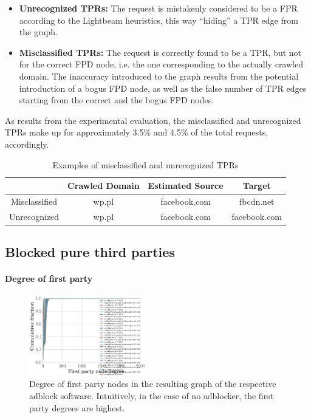 \documentclass{sig-alternate}
\begin{document}
\begin{itemize}
\item \textbf{Unrecognized TPRs:} The request is mistakenly considered to be a FPR according to the Lightbeam heuristics, this way ``hiding'' a TPR edge from the graph.
\item \textbf{Misclassified TPRs:} The request is correctly found to be a TPR, but not for the correct FPD node, i.e. the one corresponding to the actually crawled domain. The inaccuracy introduced to the graph results from the potential introduction of a bogus FPD node, as well as the false number of TPR edges starting from the correct and the bogus FPD nodes.
\end{itemize}

As results from the experimental evaluation, the misclassified and unrecognized TPRs make up for approximately 3.5\% and 4.5\% of the total requests, accordingly.

\begin{table}
\centering
\small
\begin{tabular}{|c|c c c|}
\hline
& Crawled Domain & Estimated Source & Target \\
\hline
Misclassified & wp.pl & facebook.com & fbcdn.net \\
Unrecognized & wp.pl & facebook.com & facebook.com \\
\hline
\end{tabular}
\label{table:false_positive_examples}
\caption{Examples of misclassified and unrecognized TPRs}
\end{table}

\subsection{Blocked pure third parties}

\paragraph{Degree of first party}
\begin{figure}[h]
  \centering
  \includegraphics[width=0.45\textwidth]{figures/degree_first_parties.eps}
  \caption{Degree of first party nodes in the resulting graph of the respective adblock software. Intuitively, in the case of no adblocker, the first party degrees are highest.}\label{fig:degree_first_parties}
\end{figure}
\end{document}
